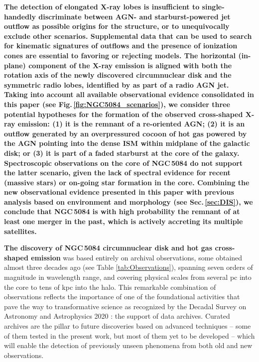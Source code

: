 \documentclass[modern]{aastex631}
\begin{document}
\textbf{The detection of elongated X-ray lobes is insufficient to single-handedly discriminate between AGN- and starburst-powered jet outflow as possible origins for the structure, or to unequivocally exclude other scenarios. Supplemental data that can be used to search for kinematic signatures of outflows and the presence of ionization cones are essential to favoring or rejecting models.   
The horizontal (in-plane) component of the X-ray emission is aligned with both the rotation axis of the newly discovered circumnuclear disk and the symmetric radio lobes, identified by \citet{irwin+2019aj158_21} as part of a radio AGN jet. Taking into account all available observational evidence consolidated in this paper (see Fig.\,\ref{fig:NGC5084_scenarios}), we consider three potential hypotheses for the formation of the observed cross-shaped X-ray emission: (1) it is the remnant of a re-oriented AGN; (2) it is an outflow generated by an overpressured cocoon of hot gas powered by the AGN pointing into the dense ISM within midplane of the galactic disk; or (3) it is part of a faded starburst at the core of the galaxy. Spectroscopic observations on the core of NGC\,5084 do not support the latter scenario, given the lack of spectral evidence for recent (massive stars) or on-going star formation in the core.  Combining the new observational evidence presented in this paper with previous analysis based on environment and morphology (see Sec.\,\ref{sec:DIS}), we conclude that NGC\,5084 is with high probability the remnant of at least one merger in the past, which is actively accreting its multiple satellites.}

\textbf{The discovery of NGC\,5084 circumnuclear disk and hot gas cross-shaped emission} was based entirely on archival observations, some obtained almost three decades ago (see Table \ref{tab:Observations}), spanning seven orders of magnitude in wavelength range, and covering physical scales from several pc into the core to tens of kpc into the halo. This remarkable combination of observations reflects the importance of one of the foundational activities that pave the way to transformative science as recognized by the Decadal Survey on Astronomy and Astrophysics 2020 \citep{2021pdaa.book.....N}: the support of data archives. Curated archives are the pillar to future discoveries based on advanced techniques -- some of them tested in the present work, but most of them yet to be developed -- which will enable the detection of previously unseen phenomena from both old and new observations.
\end{document}
